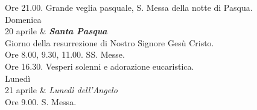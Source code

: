 \begin{center}
\begin{tblr}
{Ore 21.00. Grande veglia pasquale, S. Messa della notte di Pasqua.
}
\\
{Domenica \\ 20 aprile}
&
{
{\large\textbf{\textit{Santa Pasqua}}} \\
Giorno della resurrezione di Nostro Signore Gesù Cristo. \\
Ore 8.00, 9.30, 11.00. SS. Messe. \\
Ore 16.30. Vesperi solenni e adorazione eucaristica.
}
\\
{Lunedì \\ 21 aprile}
&
{
{\large\textit{Lunedì dell'Angelo}} \\
Ore 9.00. S. Messa.
}
\end{tblr}

\end{center}


\normalsize
